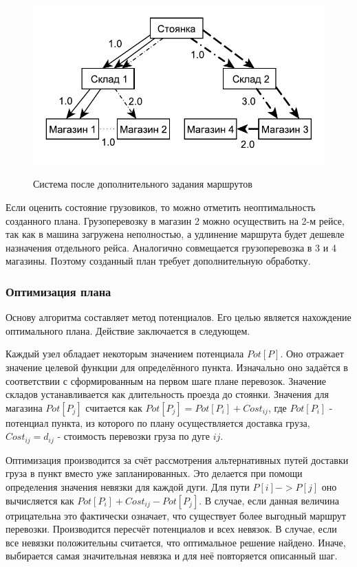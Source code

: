  	\begin{figure}[h]
	 	\begin{center}
	 		{\includegraphics[scale=1.0, angle=0]{img/max_elem_3.pdf}}
	 		\caption{Система после дополнительного задания маршрутов}
	 		\label{pic:pre_3}
	 	\end{center}
	 \end{figure}
 
 	Если оценить состояние грузовиков, то можно отметить неоптимальность созданного плана. Грузоперевозку в магазин 2 можно осуществить на 2-м рейсе, так как в машина загружена неполностью, а удлинение маршрута будет дешевле назначения отдельного рейса. Аналогично совмещается грузоперевозка в 3 и 4 магазины. Поэтому созданный план требует дополнительную обработку.
	
	\subsubsection{Оптимизация плана}
	Основу алгоритма составляет метод потенциалов. Его целью является нахождение оптимального плана\cite{potential}. Действие заключается в следующем.
	
	Каждый узел обладает некоторым значением потенциала $Pot[P]$. Оно отражает значение целевой функции для определённого пункта. Изначально оно задаётся в соответствии с сформированным на первом шаге плане перевозок. Значение складов устанавливается как длительность проезда до стоянки. Значения для магазина $Pot[P_j]$ считается как $Pot[P_j] = Pot[P_i] + Cost_{ij}$, где $Pot[P_i]$ - потенциал пункта, из которого по плану осуществляется доставка груза, $Cost_{ij} = d_{ij}$ - стоимость перевозки груза по дуге $ij$.
	
	Оптимизация производится за счёт рассмотрения альтернативных путей доставки груза в пункт вместо уже запланированных. Это делается при помощи определения значения невязки для каждой дуги. Для пути $P[i] -> P[j]$ оно вычисляется как $Pot[P_i] + Cost_{ij}-Pot[P_j]$. В случае, если данная величина отрицательна это фактически означает, что существует более выгодный маршрут перевозки. Производится пересчёт потенциалов и всех невязок. В случае, если все невязки положительны считается, что оптимальное решение найдено. Иначе, выбирается самая значительная невязка и для неё повторяется описанный шаг.
	
